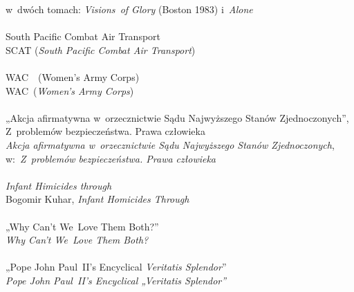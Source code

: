 \documentclass[a4paper,11pt]{article}
\begin{document}
\Powin w~dwóch tomach: \textit{Visions~of Glory} (Boston 1983)
i~\emph{Alone} \\
 \\
\Jest  South Pacific Combat Air Transport \\
\Powin SCAT (\textit{South Pacific Combat Air Transport}) \\
 \\
\Jest  WAC~~(Women's Army Corps) \\
\Powin WAC~(\textit{Women's Army Corps}) \\
 \\
\Jest „Akcja afirmatywna w~orzecznictwie Sądu Najwyższego Stanów
Zjednoczonych”, Z~problemów bezpieczeństwa. Prawa człowieka \\
\Powin \textit{Akcja afirmatywna w~orzecznictwie Sądu Najwyższego Stanów
  Zjednoczonych}, w:~\emph{Z~problemów bezpieczeństwa. Prawa człowieka} \\
 \\
\Jest \textit{Infant Himicides through} \\
\Powin Bogomir Kuhar, \textit{Infant Homicides Through} \\
 \\
\Jest  „Why Can't We~Love Them Both?” \\
\Powin \textit{Why Can't We~Love Them Both?} \\
 \\
\Jest  „Pope John Paul~II's Encyclical \textit{Veritatis Splendor}” \\
\Powin \textit{Pope John Paul~II's Encyclical „Veritatis Splendor”} \\


\vspace{\spaceTwo}












\end{document}
